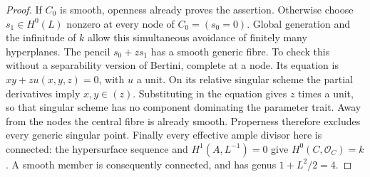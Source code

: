 \begin{proof}
If \(C_0\) is smooth, openness already proves the assertion.
Otherwise choose \(s_1\in H^0(L)\) nonzero at every node of
\(C_0=(s_0=0)\). Global generation and the infinitude of \(k\)
allow this simultaneous avoidance of finitely many hyperplanes.
The pencil \(s_0+z s_1\) has a smooth generic fibre. To check
this without a separability version of Bertini, complete at a node.
Its equation is \(xy+z u(x,y,z)=0\), with \(u\) a unit.
On its relative singular scheme the partial derivatives imply
\(x,y\in(z)\). Substituting in the equation gives \(z\) times
a unit, so that singular scheme has no component dominating the
parameter trait. Away from the nodes the central fibre is already
smooth. Properness therefore excludes every generic singular point.
Finally every effective ample divisor here is connected: the
hypersurface sequence and \(H^1(A,L^{-1})=0\) give
\(H^0(C,\mathcal O_C)=k\). A smooth member is consequently
connected, and has genus \(1+L^2/2=4\).
\end{proof}

